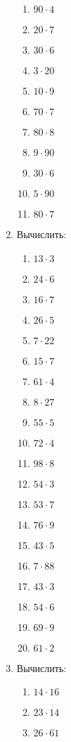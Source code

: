 \documentclass[12pt, a4paper]{article}
\begin{document}
\begin{enumerate}
\begin{multicols}{5}
\begin{enumerate}
			\item $90\cdot4$
			\item $20\cdot7$
			\item $30\cdot6$
			\item $3\cdot20$
			\item $10\cdot9$
			\item $70\cdot7$
			\item $80\cdot8$
			\item $9\cdot90$
			\item $30\cdot6$
			\item $5\cdot90$
			\item $80\cdot7$
		\end{enumerate}
	\end{multicols}
	\item Вычислить:
	\begin{multicols}{5}
		\begin{enumerate}
			\item $13\cdot3$
			\item $24\cdot6$
			\item $16\cdot7$
			\item $26\cdot5$
			\item $7\cdot22$
			\item $15\cdot7$
			\item $61\cdot4$
			\item $8\cdot27$
			\item $55\cdot5$
			\item $72\cdot4$
			\item $98\cdot8$
			\item $54\cdot3$
			\item $53\cdot7$
			\item $76\cdot9$
			\item $43\cdot5$
			\item $7\cdot88$
			\item $43\cdot3$
			\item $54\cdot6$
			\item $69\cdot9$
			\item $61\cdot2$
		\end{enumerate}
	\end{multicols}
	\item Вычислить:
	\begin{multicols}{5}
		\begin{enumerate}
			\item $14\cdot16$
			\item $23\cdot14$
			\item $26\cdot61$

\end{enumerate}
\end{multicols}
\end{enumerate}
\end{document}
